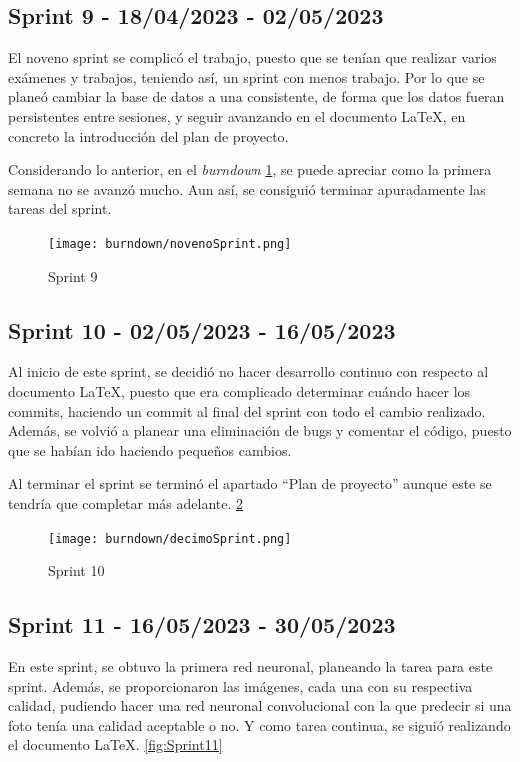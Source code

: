 \subsection{Sprint 9 - 18/04/2023 - 02/05/2023}
El noveno sprint se complicó el trabajo, puesto que se tenían que realizar varios exámenes y trabajos, teniendo así, un sprint con menos trabajo. Por lo que se planeó cambiar la base de datos a una consistente, de forma que los datos fueran persistentes entre sesiones, y seguir avanzando en el documento LaTeX, en concreto la introducción del plan de proyecto.

Considerando lo anterior, en el \textit{burndown} \ref{fig:Sprint9}, se puede apreciar como la primera semana no se avanzó mucho. Aun así, se consiguió terminar apuradamente las tareas del sprint.
\begin{figure}[!ht]
         \centering
         \texttt{[image: burndown/novenoSprint.png]}
         \caption{Sprint 9}
         \label{fig:Sprint9}
\end{figure}

\subsection{Sprint 10 - 02/05/2023 - 16/05/2023}

Al inicio de este sprint, se decidió no hacer desarrollo continuo con respecto al documento LaTeX, puesto que era complicado determinar cuándo hacer los commits, haciendo un commit al final del sprint con todo el cambio realizado. Además, se volvió a planear una eliminación de bugs y comentar el código, puesto que se habían ido haciendo pequeños cambios.

Al terminar el sprint se terminó el apartado ``Plan de proyecto'' aunque este se tendría que completar más adelante. \ref{fig:Sprint10}
\begin{figure}[!ht]
         \centering
         \texttt{[image: burndown/decimoSprint.png]}
         \caption{Sprint 10}
         \label{fig:Sprint10}
\end{figure}

\subsection{Sprint 11 - 16/05/2023 - 30/05/2023}
En este sprint, se obtuvo la primera red neuronal, planeando la tarea para este sprint. Además, se proporcionaron las imágenes, cada una con su respectiva calidad, pudiendo hacer una red neuronal convolucional con la que predecir si una foto tenía una calidad aceptable o no. Y como tarea continua, se siguió realizando el documento LaTeX. \ref{fig:Sprint11}

